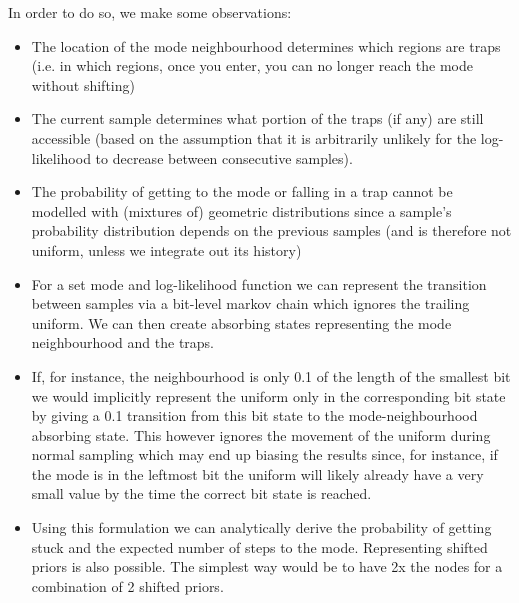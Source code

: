 In order to do so, we make some observations:
\begin{itemize}

\item
The location of the mode neighbourhood determines which regions are traps (i.e. in which regions, once you enter, you can no longer reach the mode without shifting)

\item
The current sample determines what portion of the traps (if any) are still accessible (based on the assumption that it is arbitrarily unlikely for the log-likelihood to decrease between consecutive samples).

\item
The probability of getting to the mode or falling in a trap cannot be modelled with (mixtures of) geometric distributions since a sample's probability distribution depends on the previous samples (and is therefore not uniform, unless we integrate out its history)

\item
For a set mode and log-likelihood function we can represent the transition between samples via a bit-level markov chain which ignores the trailing uniform. We can then create absorbing states representing the mode neighbourhood and the traps.

\item
If, for instance, the neighbourhood is only 0.1 of the length of the smallest bit we would implicitly represent the uniform only in the corresponding bit state by giving a 0.1 transition from this bit state to the mode-neighbourhood absorbing state. This however ignores the movement of the uniform during normal sampling which may end up biasing the results since, for instance, if the mode is in the leftmost bit the uniform will likely already have a very small value by the time the correct bit state is reached. 

\item
Using this formulation we can analytically derive the probability of getting stuck and the expected number of steps to the mode. Representing shifted priors is also possible. The simplest way would be to have 2x the nodes for a combination of 2 shifted priors.

\end{itemize}


